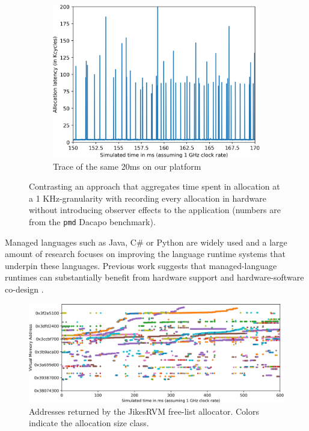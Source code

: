 \begin{figure}
\begin{subfigure}[t]{0.32\textwidth}
		\includegraphics[width=\textwidth]{results/java-alloc-detailed.png}
		\caption{Trace of the same 20ms on our platform}
	\end{subfigure}
	\caption{Contrasting an approach that aggregates time spent in allocation at a 1 KHz-granularity with recording every allocation in hardware without introducing observer effects to the application (numbers are from the \texttt{pmd} Dacapo benchmark).}
	\label{fig:java_alloc}
\end{figure}

Managed languages such as Java, C\# or Python are widely used and a large
amount of research focuses on improving the language runtime systems that
underpin these languages. Previous work suggests that managed-language runtimes
can substantially benefit from hardware support and hardware-software co-design
\cite{Click:2005:PGA:1064979.1064988,Wright:2005:OMA:1698178,Ungar:1984:ASS:800015.808182,Joao:2009:FRH:1555754.1555806}.


\begin{figure}[t]
		\centering
		\includegraphics[width=\columnwidth]{results/heatmap.png}
		\caption{Addresses returned by the JikesRVM free-list allocator. Colors indicate the allocation size class.}
		\label{fig:java_alloc_heatmap}
\end{figure}

